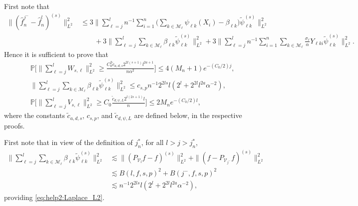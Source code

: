 \documentclass[preprint]{imsart}
\renewcommand{\P}{\mathbb{P}}
\numberwithin{equation}{section}
\begin{document}
\begin{appendix}
First note that
\begin{align}
\|(\hat{f}_n^{j^-} -\hat{f}_n^l)^{(s)}\|_{L^2}^2&\leq
3\Big\|\sum_{\ell=j}^{l} n^{-1}\sum_{i=1}^n   \Big(\sum_{k\in\mathcal{M}_\ell} \psi_{\ell k}(X_i)-\beta_{\ell k}  \Big) \tilde\psi_{\ell k}^{(s)}\Big\|_{L^2}^2 \nonumber\\
&\qquad +3\Big\| \sum_{\ell=j}^{l} \sum_{k\in\mathcal{M}_\ell} \beta_{\ell k} \tilde\psi_{\ell k}^{(s)}\Big\|_{L^2}^2
+ 3 \Big\|\sum_{\ell=j}^{l}  n^{-1}\sum_{i=1}^n \sum_{k\in\mathcal{M}_\ell} \frac{\sigma_\ell}{\alpha}Y_{\ell k i} \tilde\psi_{\ell k}^{(s)}\Big\|_{L^2}^2.\label{eq:BiasEst}
\end{align}
Hence it is sufficient to prove that
\begin{align}
&\P\Big[\| \sum_{\ell=j}^{l} W_{s,\ell}\|_{L^2}^2\geq   \frac{C_0^2 \tilde{c}_{a,d,s} 2^{2l(s+1)} l^{2a+1}}{n\alpha^2}  \Big]\leq 4(M_n+1)  e^{-(C_0/2)j},\label{eq:help1:Laplace_L2}\\
&\| \sum_{\ell=j}^{l} \sum_{k\in\mathcal{M}_\ell} \beta_{\ell k}  \tilde\psi_{\ell k}^{(s)}\|_{L^2}^2\leq c_{s,p} n^{-1}2^{2ls}l(2^{l}+2^{2l}l^{2a}\alpha^{-2}),\label{eq:help2:Laplace_L2}\\
&\P\Big[\| \sum_{\ell=j}^{l} V_{s,\ell}\|_{L^2}^2\geq C_0\frac{\tilde{c}_{d,\psi,L} 2^{l (2s+1)}l}{n} \Big]\leq 2 M_n e^{-(C_0/2)l},\label{eq:help3:Laplace_L2}
\end{align}
where the constants $\tilde{c}_{a,d,s}$, $c_{s,p}$, and $\tilde{c}_{d,\psi,L}$ are defined below, in the respective proofs. 


First note that in view of the definition of $j_n^*$, for all $l>j>j_n^*$,
\begin{align*}
\Big\| \sum_{\ell=j}^{l} \sum_{k\in\mathcal{M}_\ell} \beta_{\ell k}  \tilde\psi_{\ell k}^{(s)}\Big\|_{L^2}^2
&\lesssim \|(P_{\mathcal{V}_l}f- f)^{(s)}\|_{L^2}^2+ \|(f-P_{\mathcal{V}_{j^{-}}}f)^{(s)}\|_{L^2}^2\nonumber\\
&\lesssim B(l,f,s,p)^2+B(j^-,f,s,p)^2\\
&\lesssim n^{-1}2^{2ls}l(2^{l}+2^{2l}l^{2a}\alpha^{-2}),
\end{align*}
providing  \eqref{eq:help2:Laplace_L2}. 




\end{appendix}
\end{document}
